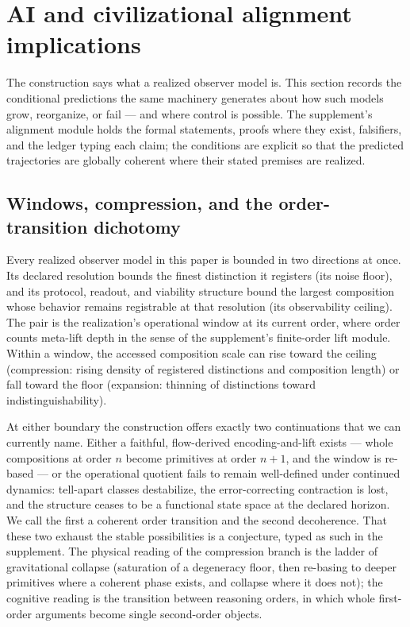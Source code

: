 \documentclass[11pt]{article}
\theoremstyle{definition}
\begin{document}
\section{AI and civilizational alignment implications}

The construction says what a realized observer model is. This section records the conditional predictions the same machinery generates about how such models grow, reorganize, or fail --- and where control is possible. The supplement's alignment module holds the formal statements, proofs where they exist, falsifiers, and the ledger typing each claim; the conditions are explicit so that the predicted trajectories are globally coherent where their stated premises are realized.

\subsection{Windows, compression, and the order-transition dichotomy}

Every realized observer model in this paper is bounded in two directions at once. Its declared resolution bounds the finest distinction it registers (its noise floor), and its protocol, readout, and viability structure bound the largest composition whose behavior remains registrable at that resolution (its observability ceiling). The pair is the realization's operational window at its current order, where order counts meta-lift depth in the sense of the supplement's finite-order lift module. Within a window, the accessed composition scale can rise toward the ceiling (compression: rising density of registered distinctions and composition length) or fall toward the floor (expansion: thinning of distinctions toward indistinguishability).

At either boundary the construction offers exactly two continuations that we can currently name. Either a faithful, flow-derived encoding-and-lift exists --- whole compositions at order $n$ become primitives at order $n+1$, and the window is re-based --- or the operational quotient fails to remain well-defined under continued dynamics: tell-apart classes destabilize, the error-correcting contraction is lost, and the structure ceases to be a functional state space at the declared horizon. We call the first a coherent order transition and the second decoherence. That these two exhaust the stable possibilities is a conjecture, typed as such in the supplement. The physical reading of the compression branch is the ladder of gravitational collapse (saturation of a degeneracy floor, then re-basing to deeper primitives where a coherent phase exists, and collapse where it does not); the cognitive reading is the transition between reasoning orders, in which whole first-order arguments become single second-order objects.
\end{document}
